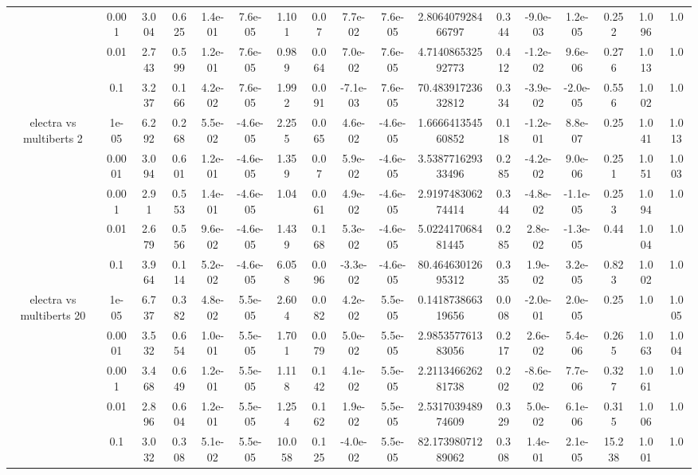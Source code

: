 \begin{tabular}{|c|c|c|c|c|c|c|c|c|c|c|c|c|c|c|c|c|}
 & 0.001 & 3.004 & 0.625 & 1.4e-01 & 7.6e-05 & 1.101 & 0.07 & 7.7e-02 & 7.6e-05 & 2.806407928466797 & 0.344 & -9.0e-03 & 1.2e-05 & 0.252 & 1.096 & 1.0 \\
 & 0.01 & 2.743 & 0.599 & 1.2e-01 & 7.6e-05 & 0.989 & 0.064 & 7.0e-02 & 7.6e-05 & 4.714086532592773 & 0.412 & -1.2e-02 & 9.6e-06 & 0.276 & 1.013 & 1.0 \\
 & 0.1 & 3.237 & 0.166 & 4.2e-02 & 7.6e-05 & 1.992 & 0.091 & -7.1e-03 & 7.6e-05 & 70.48391723632812 & 0.334 & -3.9e-02 & -2.0e-05 & 0.556 & 1.002 & 1.0 \\
\hline
\multirow{5}{*}{electra  vs multiberts 2} & 1e-05 & 6.292 & 0.268 & 5.5e-02 & -4.6e-05 & 2.255 & 0.065 & 4.6e-02 & -4.6e-05 & 1.666641354560852 & 0.118 & -1.2e-01 & 8.8e-07 & 0.25 & 1.041 & 1.013 \\
 & 0.0001 & 3.094 & 0.601 & 1.2e-01 & -4.6e-05 & 1.359 & 0.07 & 5.9e-02 & -4.6e-05 & 3.538771629333496 & 0.285 & -4.2e-02 & 9.0e-06 & 0.251 & 1.051 & 1.003 \\
 & 0.001 & 2.91 & 0.553 & 1.4e-01 & -4.6e-05 & 1.04 & 0.061 & 4.9e-02 & -4.6e-05 & 2.919748306274414 & 0.344 & -4.8e-02 & -1.1e-05 & 0.253 & 1.094 & 1.0 \\
 & 0.01 & 2.679 & 0.556 & 9.6e-02 & -4.6e-05 & 1.439 & 0.168 & 5.3e-02 & -4.6e-05 & 5.022417068481445 & 0.285 & 2.8e-02 & -1.3e-05 & 0.44 & 1.004 & 1.0 \\
 & 0.1 & 3.964 & 0.114 & 5.2e-02 & -4.6e-05 & 6.058 & 0.096 & -3.3e-02 & -4.6e-05 & 80.46463012695312 & 0.335 & 1.9e-02 & 3.2e-05 & 0.823 & 1.002 & 1.0 \\
\hline
\multirow{5}{*}{electra  vs multiberts 20} & 1e-05 & 6.737 & 0.382 & 4.8e-02 & 5.5e-05 & 2.604 & 0.082 & 4.2e-02 & 5.5e-05 & 0.141873866319656 & 0.008 & -2.0e-01 & 2.0e-05 & 0.25 & 1.0 & 1.005 \\
 & 0.0001 & 3.532 & 0.654 & 1.0e-01 & 5.5e-05 & 1.701 & 0.079 & 5.0e-02 & 5.5e-05 & 2.985357761383056 & 0.217 & 2.6e-02 & 5.4e-06 & 0.265 & 1.063 & 1.004 \\
 & 0.001 & 3.468 & 0.649 & 1.2e-01 & 5.5e-05 & 1.118 & 0.142 & 4.1e-02 & 5.5e-05 & 2.211346626281738 & 0.202 & -8.6e-02 & 7.7e-06 & 0.327 & 1.061 & 1.0 \\
 & 0.01 & 2.896 & 0.604 & 1.2e-01 & 5.5e-05 & 1.254 & 0.162 & 1.9e-02 & 5.5e-05 & 2.531703948974609 & 0.329 & 5.0e-02 & 6.1e-06 & 0.315 & 1.006 & 1.0 \\
 & 0.1 & 3.032 & 0.308 & 5.1e-02 & 5.5e-05 & 10.058 & 0.125 & -4.0e-02 & 5.5e-05 & 82.17398071289062 & 0.308 & 1.4e-01 & 2.1e-05 & 15.238 & 1.001 & 1.0 \\

\end{tabular}
